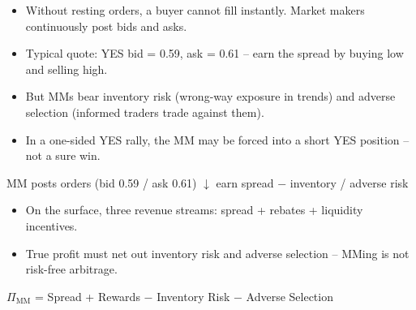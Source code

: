 \begin{frame}[t]
\par{}
\begin{pmbody}
\begin{itemize}\pmspreaditems
  \item Without resting orders, a buyer cannot fill instantly. Market makers continuously post bids and asks.
  \item Typical quote: YES bid = 0.59, ask = 0.61 -- earn the spread by buying low and selling high.
  \item But MMs bear inventory risk (wrong-way exposure in trends) and adverse selection (informed traders trade against them).
  \item In a one-sided YES rally, the MM may be forced into a short YES position -- not a sure win.
\end{itemize}
\begin{pmcallout}[]
  MM posts orders (bid 0.59 / ask 0.61) \quad $\downarrow$ \quad earn spread $-$ inventory / adverse risk
\end{pmcallout}
\end{pmbody}
\end{frame}

\begin{frame}[t]
\par{}
\begin{pmbody}
\begin{itemize}\pmspreaditems
  \item On the surface, three revenue streams: spread + rebates + liquidity incentives.
  \item True profit must net out inventory risk and adverse selection -- MMing is not risk-free arbitrage.
\end{itemize}
\begin{pmcallout}[]
  $\Pi_{\text{MM}}$ = Spread + Rewards $-$ Inventory Risk $-$ Adverse Selection
\end{pmcallout}
\end{pmbody}
\end{frame}

